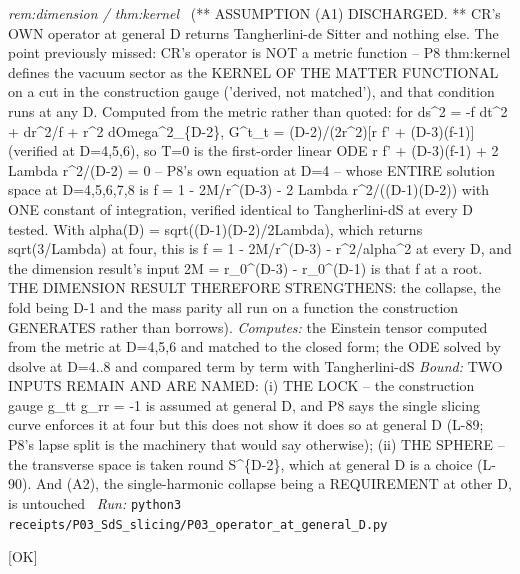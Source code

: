 \begin{description}
\textit{rem:dimension / thm:kernel} \ (** ASSUMPTION (A1) DISCHARGED. ** CR's OWN operator at general D returns Tangherlini-de Sitter and nothing else. The point previously missed: CR's operator is NOT a metric function -- P8 thm:kernel defines the vacuum sector as the KERNEL OF THE MATTER FUNCTIONAL on a cut in the construction gauge ('derived, not matched'), and that condition runs at any D. Computed from the metric rather than quoted: for ds\textasciicircum{}2 = -f dt\textasciicircum{}2 + dr\textasciicircum{}2/f + r\textasciicircum{}2 dOmega\textasciicircum{}2\_\{D-2\}, G\textasciicircum{}t\_t = (D-2)/(2r\textasciicircum{}2)[r f' + (D-3)(f-1)] (verified at D=4,5,6), so T=0 is the first-order linear ODE r f' + (D-3)(f-1) + 2 Lambda r\textasciicircum{}2/(D-2) = 0 -- P8's own equation at D=4 -- whose ENTIRE solution space at D=4,5,6,7,8 is f = 1 - 2M/r\textasciicircum{}(D-3) - 2 Lambda r\textasciicircum{}2/((D-1)(D-2)) with ONE constant of integration, verified identical to Tangherlini-dS at every D tested. With alpha(D) = sqrt((D-1)(D-2)/2Lambda), which returns sqrt(3/Lambda) at four, this is f = 1 - 2M/r\textasciicircum{}(D-3) - r\textasciicircum{}2/alpha\textasciicircum{}2 at every D, and the dimension result's input 2M = r\_0\textasciicircum{}(D-3) - r\_0\textasciicircum{}(D-1) is that f at a root. THE DIMENSION RESULT THEREFORE STRENGTHENS: the collapse, the fold being D-1 and the mass parity all run on a function the construction GENERATES rather than borrows). 
\emph{Computes:} the Einstein tensor computed from the metric at D=4,5,6 and matched to the closed form; the ODE solved by dsolve at D=4..8 and compared term by term with Tangherlini-dS
 \emph{Bound:} TWO INPUTS REMAIN AND ARE NAMED: (i) THE LOCK -- the construction gauge g\_tt g\_rr = -1 is assumed at general D, and P8 says the single slicing curve enforces it at four but this does not show it does so at general D (L-89; P8's lapse split is the machinery that would say otherwise); (ii) THE SPHERE -- the transverse space is taken round S\textasciicircum{}\{D-2\}, which at general D is a choice (L-90). And (A2), the single-harmonic collapse being a REQUIREMENT at other D, is untouched
\ \emph{Run:} \texttt{python3 receipts/P03\_SdS\_slicing/P03\_operator\_at\_general\_D.py}
\item[\label{rcpt:P03_batch2_runnable}\texttt{P03\_batch2\_runnable}]\hfill\textsf{[OK]}\\

\end{description}
